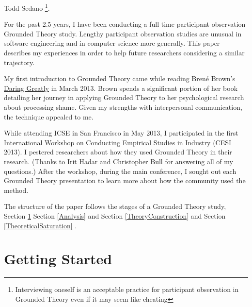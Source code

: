   \textemdash Todd Sedano \footnote{Interviewing oneself is an acceptable practice for participant observation in Grounded Theory even if it may seem like cheating}. 

For the past 2.5 years, I have been conducting a full-time participant observation Grounded Theory study. Lengthy participant observation studies are unusual in software engineering and in computer science more generally. This paper describes my experiences in order to help future researchers considering a similar trajectory. 

My first introduction to Grounded Theory came while reading Bren\'{e} Brown's \underline{Daring Greatly} \cite{BreneBrownDaringGreatly} in March 2013. Brown spends a significant portion of her book detailing her journey in applying Grounded Theory to her psychological research about processing shame. Given my strengths with interpersonal communication, the technique appealed to me. 

While attending ICSE in San Francisco in May 2013, I participated in the first International Workshop on Conducting Empirical Studies in Industry (CESI 2013). I pestered researchers about how they used Grounded Theory in their research. (Thanks to Irit Hadar and Christopher Bull for answering all of my questions.) After the workshop, during the main conference, I sought out each Grounded Theory presentation to learn more about how the community used the method.

The structure of the paper follows the stages of a Grounded Theory study,  Section \ref{GettingStarted}  Section \ref{Analysis}  and Section \ref{TheoryConstruction}  and Section \ref{TheoreticalSaturation} .
\section{Getting Started}
\label{GettingStarted}

